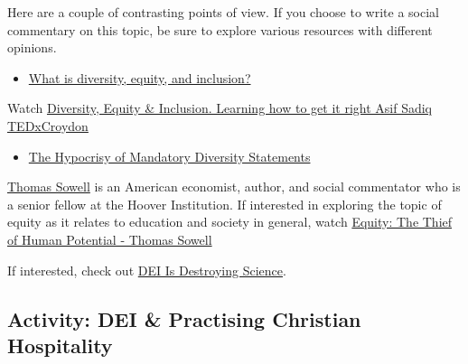 \documentclass[
]{book}
\providecommand{\tightlist}{%
  \setlength{\itemsep}{0pt}\setlength{\parskip}{0pt}}
\theoremstyle{definition}
\theoremstyle{definition}
\theoremstyle{definition}
\theoremstyle{definition}
\theoremstyle{remark}
\begin{document}
\begin{reflect}
Here are a couple of contrasting points of view. If you choose to write a social commentary on this topic, be sure to explore various resources with different opinions.

\begin{itemize}
\tightlist
\item
  \href{https://www.mckinsey.com/featured-insights/mckinsey-explainers/what-is-diversity-equity-and-inclusion}{What is diversity, equity, and inclusion?}
\end{itemize}

Watch \href{https://www.youtube.com/watch?v=HR4wz1b54hw}{Diversity, Equity \& Inclusion. Learning how to get it right \textbar{} Asif Sadiq \textbar{} TEDxCroydon}

\begin{itemize}
\tightlist
\item
  \href{https://www.theatlantic.com/ideas/archive/2023/07/hypocrisy-mandatory-diversity-statements/674611/}{The Hypocrisy of Mandatory Diversity Statements}
\end{itemize}

\href{https://en.wikipedia.org/wiki/Thomas_Sowell}{Thomas Sowell} is an American economist, author, and social commentator who is a senior fellow at the Hoover Institution. If interested in exploring the topic of equity as it relates to education and society in general, watch \href{https://www.youtube.com/watch?v=8WYi-64MejU}{Equity: The Thief of Human Potential - Thomas Sowell}

If interested, check out \href{https://www.youtube.com/watch?v=gpP_SUGthv0}{DEI Is Destroying Science}.
\end{reflect}

\hypertarget{activity-dei-practising-christian-hospitality}{%
\subsection*{Activity: DEI \& Practising Christian Hospitality}\label{activity-dei-practising-christian-hospitality}}
\end{document}
